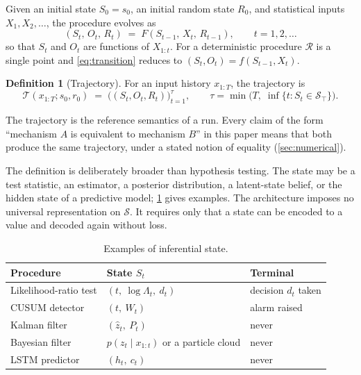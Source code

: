 \documentclass[11pt,a4paper]{article}
\theoremstyle{definition}
\newtheorem{definition}{Definition}
\theoremstyle{remark}
\newcommand{\State}{\mathcal{S}}
\newcommand{\Random}{\mathcal{R}}
\newcommand{\Term}{\State_{\top}}
\newcommand{\Traj}{\mathcal{T}}
\begin{document}
Given an initial state $S_0=s_0$, an initial random state $R_0$, and
statistical inputs $X_1,X_2,\ldots$, the procedure evolves as
\begin{equation}
(S_t,\,O_t,\,R_t) \;=\; F(S_{t-1},\,X_t,\,R_{t-1}),
\qquad t=1,2,\ldots
\label{eq:transition}
\end{equation}
so that $S_t$ and $O_t$ are functions of $X_{1:t}$. For a deterministic
procedure $\Random$ is a single point and \eqref{eq:transition} reduces
to $(S_t,O_t)=f(S_{t-1},X_t)$.

\begin{definition}[Trajectory]
\label{def:trajectory}
For an input history $x_{1:T}$, the trajectory is
\[
\Traj(x_{1:T};s_0,r_0) \;=\; \bigl((S_t,O_t,R_t)\bigr)_{t=1}^{\tau},
\qquad
\tau=\min\bigl(T,\;\inf\{t: S_t\in\Term\}\bigr).
\]
\end{definition}

The trajectory is the reference semantics of a run. Every claim of the
form ``mechanism $A$ is equivalent to mechanism $B$'' in this paper
means that both produce the same trajectory, under a stated notion of
equality (\cref{sec:numerical}).

The definition is deliberately broader than hypothesis testing. The
state may be a test statistic, an estimator, a posterior distribution, a
latent-state belief, or the hidden state of a predictive model;
\cref{tab:states} gives examples. The architecture imposes no universal
representation on $\State$. It requires only that a state can be encoded
to a value and decoded again without loss.

\begin{table}[t]
\centering
\caption{Examples of inferential state.}
\label{tab:states}
\begin{tabular}{lll}
\toprule
\textbf{Procedure} & \textbf{State $S_t$} & \textbf{Terminal} \\
\midrule
Likelihood-ratio test & $(t,\ \log\Lambda_t,\ d_t)$ & decision $d_t$ taken \\
CUSUM detector & $(t,\ W_t)$ & alarm raised \\
Kalman filter & $(\hat z_t,\ P_t)$ & never \\
Bayesian filter & $p(z_t\mid x_{1:t})$ or a particle cloud & never \\
LSTM predictor & $(h_t,\ c_t)$ & never \\
\bottomrule
\end{tabular}
\end{table}

\end{document}
